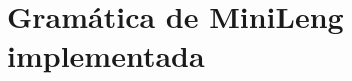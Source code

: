 \documentclass[../main.tex]{subfiles}
\begin{document}
\section{Gramática de MiniLeng implementada} \label{gramatica}
\end{document}
